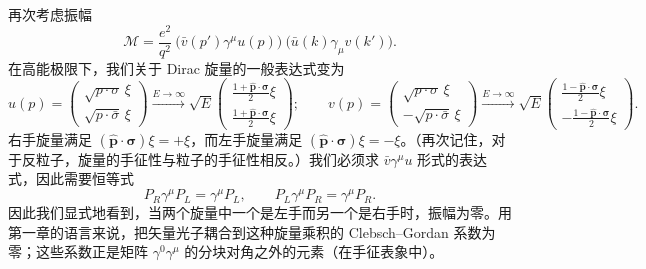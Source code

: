 再次考虑振幅
\begin{equation}
  \mathcal{M} = \frac{e^2}{q^2}\
    \bigl( \bar{v}(p')\gamma^\mu u(p) \bigr)\
    \bigl( \bar{u}(k)\gamma_\mu v(k') \bigr) .
  \label{eq:5.25}
\end{equation}
在高能极限下，我们关于 Dirac 旋量的一般表达式变为
\begin{equation}
  u(p) = \begin{pmatrix}
    \sqrt{p\cdot\sigma}\,\xi\\
    \sqrt{p\cdot\bar{\sigma}}\,\xi
  \end{pmatrix}
  \xrightarrow{E\to\infty}
  \sqrt{E}\begin{pmatrix}
    \frac{1+\hat{\mathbf{p}}\cdot\bm{\sigma}}{2}\xi\\
    \frac{1+\hat{\mathbf{p}}\cdot\bm{\sigma}}{2}\xi
  \end{pmatrix};\qquad
  v(p) = \begin{pmatrix}
    \sqrt{p\cdot\sigma}\,\xi\\
    -\sqrt{p\cdot\bar{\sigma}}\,\xi
  \end{pmatrix}
  \xrightarrow{E\to\infty}
  \sqrt{E}\begin{pmatrix}
    \frac{1-\hat{\mathbf{p}}\cdot\bm{\sigma}}{2}\xi\\
    -\frac{1-\hat{\mathbf{p}}\cdot\bm{\sigma}}{2}\xi
  \end{pmatrix} .
  \label{eq:5.26}
\end{equation}
右手旋量满足 $(\hat{\mathbf{p}}\cdot\bm{\sigma})\xi = +\xi$，而左手旋量满足 $(\hat{\mathbf{p}}\cdot\bm{\sigma})\xi = -\xi$。（再次记住，对于反粒子，旋量的手征性与粒子的手征性相反。）我们必须求 $\bar{v}\gamma^\mu u$ 形式的表达式，因此需要恒等式
\begin{equation}
  P_R\gamma^\mu P_L = \gamma^\mu P_L,\qquad
  P_L\gamma^\mu P_R = \gamma^\mu P_R .
\end{equation}
因此我们显式地看到，当两个旋量中一个是左手而另一个是右手时，振幅为零。用第一章的语言来说，把矢量光子耦合到这种旋量乘积的 Clebsch--Gordan 系数为零；这些系数正是矩阵 $\gamma^0\gamma^\mu$ 的分块对角之外的元素（在手征表象中）。


